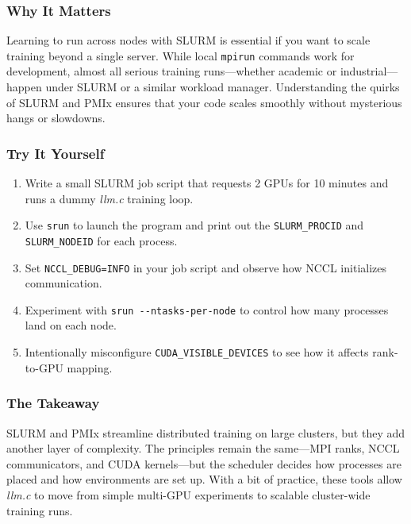 \documentclass[
  letterpaper,
  DIV=11,
  numbers=noendperiod]{scrreprt}
\providecommand{\tightlist}{%
  \setlength{\itemsep}{0pt}\setlength{\parskip}{0pt}}
\begin{document}
\subsubsection{Why It Matters}\label{why-it-matters-50}

Learning to run across nodes with SLURM is essential if you want to
scale training beyond a single server. While local \texttt{mpirun}
commands work for development, almost all serious training
runs---whether academic or industrial---happen under SLURM or a similar
workload manager. Understanding the quirks of SLURM and PMIx ensures
that your code scales smoothly without mysterious hangs or slowdowns.

\subsubsection{Try It Yourself}\label{try-it-yourself-64}

\begin{enumerate}
\def\labelenumi{\arabic{enumi}.}
\tightlist
\item
  Write a small SLURM job script that requests 2 GPUs for 10 minutes and
  runs a dummy \emph{llm.c} training loop.
\item
  Use \texttt{srun} to launch the program and print out the
  \texttt{SLURM\_PROCID} and \texttt{SLURM\_NODEID} for each process.
\item
  Set \texttt{NCCL\_DEBUG=INFO} in your job script and observe how NCCL
  initializes communication.
\item
  Experiment with \texttt{srun\ -\/-ntasks-per-node} to control how many
  processes land on each node.
\item
  Intentionally misconfigure \texttt{CUDA\_VISIBLE\_DEVICES} to see how
  it affects rank-to-GPU mapping.
\end{enumerate}

\subsubsection{The Takeaway}\label{the-takeaway-65}

SLURM and PMIx streamline distributed training on large clusters, but
they add another layer of complexity. The principles remain the
same---MPI ranks, NCCL communicators, and CUDA kernels---but the
scheduler decides how processes are placed and how environments are set
up. With a bit of practice, these tools allow \emph{llm.c} to move from
simple multi-GPU experiments to scalable cluster-wide training runs.
\end{document}
